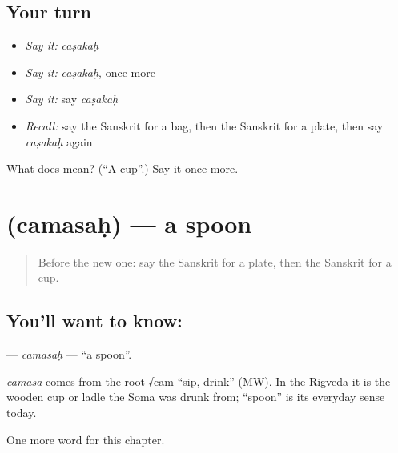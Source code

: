 \subsection*{Your turn}
\begin{itemize}
\raggedright
  \item \emph{Say it:} \emph{caṣakaḥ}
  \item \emph{Say it:} \emph{caṣakaḥ}, once more
  \item \emph{Say it:} say \emph{caṣakaḥ}
  \item \emph{Recall:} say the Sanskrit for a bag, then the Sanskrit for a plate, then say \emph{caṣakaḥ} again
\end{itemize}

\begin{tcolorbox}[breakable,colback=teal!4,colframe=teal!35!black,title={Before you move on}]
What does  mean? (\textquotedblleft{}A cup\textquotedblright{}.) Say it once more.
\end{tcolorbox}
\section[\texorpdfstring{\sk{चमसः} (camasaḥ)}{चमसः (camasaḥ)}]{ (camasaḥ) — a spoon}

\label{lesson:SA-C102-camasah}



\begin{quote}
Before the new one: say the Sanskrit for a plate, then the Sanskrit for a cup.
\end{quote}

\subsection*{You'll want to know: }
\textbf{} — \emph{camasaḥ} — \textquotedblleft{}a spoon\textquotedblright{}.

\begin{cousinweb}
\emph{camasa} comes from the root √cam \textquotedblleft{}sip, drink\textquotedblright{} (MW). In the Rigveda it is the wooden cup or ladle the Soma was drunk from; \textquotedblleft{}spoon\textquotedblright{} is its everyday sense today.
\end{cousinweb}

\begin{grammarlens}[title={What you've built}]
One more word for this chapter.
\end{grammarlens}

